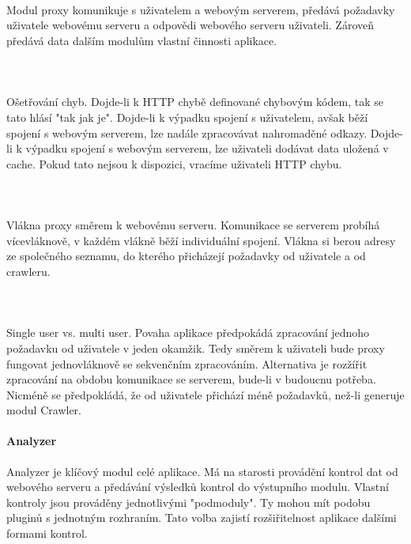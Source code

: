 \documentclass[10pt]{article}
\begin{document}
	\paragraph{~} Modul proxy komunikuje s uživatelem a webovým  serverem, předává požadavky uživatele webovému serveru a odpovědi webového serveru uživateli. Zároveň předává data dalším modulům vlastní činnosti aplikace.
	\paragraph{~}Ošetřování chyb. Dojde-li k HTTP chybě definované chybovým kódem, tak se tato hlásí "tak jak je". Dojde-li k výpadku spojení s uživatelem, avšak běží spojení s webovým serverem, lze nadále zpracovávat nahromaděné odkazy. Dojde-li k výpadku spojení s webovým serverem, lze uživateli dodávat data uložená v cache. Pokud tato nejsou k dispozici, vracíme uživateli HTTP chybu.
	\paragraph{~}Vlákna proxy směrem k webovému serveru. Komunikace se serverem prob\'ih\'a v\'icevl\'aknov\v{e}, v ka\v{z}d\'em vl\'akn\v{e} b\v{e}\v{z}\'i individu\'aln\'i spojen\'i. Vl\'akna si berou adresy ze spole\v{c}n\'eho seznamu, do kter\'eho p\v{r}ich\'azej\'i po\v{z}adavky od u\v{z}ivatele a od crawleru.
	\paragraph{~}Single user vs. multi user. Povaha aplikace p\v{r}edpok\'ad\'a zpracov\'an\'i jednoho po\v{z}adavku od u\v{z}ivatele v jeden okam\v{z}ik. Tedy sm\v{e}rem k u\v{z}ivateli bude proxy fungovat jednovl\'aknov\v{e} se sekven\v{c}n\'im zpracov\'an\'im. Alternativa je roz\v{z}\'i\v{r}it zpracov\'an\'i na obdobu komunikace se serverem, bude-li v budoucnu pot\v{r}eba. Nicm\'en\v{e} se p\v{r}edpokl\'ad\'a, \v{z}e od u\v{z}ivatele p\v{r}ich\'az\'i m\'en\v{e} po\v{z}adavk\r{u}, ne\v{z}-li generuje modul Crawler.
	\paragraph{Analyzer} Analyzer je klíčový modul celé aplikace. Má na starosti provádění kontrol dat od webového serveru a předávání výsledků kontrol do výstupního modulu. Vlastní kontroly jsou prováděny jednotlivými "podmoduly". Ty mohou mít podobu pluginů s jednotným rozhraním. Tato volba zajistí rozšiřitelnost aplikace dalšími formami kontrol. 
\end{document}
